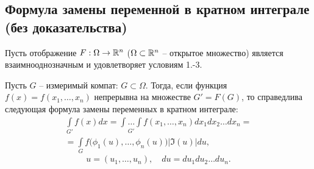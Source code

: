 \subsection{Формула замены переменной в кратном интеграле (без доказательства)}

\begin{theorem}
    Пусть отображение $ F: \Omega \rightarrow \mathbb{R}^n $ ($ \Omega \subset \mathbb{R}^n $ -- открытое множество) является взаимнооднозначным и удовлетворяет условиям 1.-3.

    Пусть $ G $ -- измеримый компат: $ G \subset \Omega $. Тогда, если функция $ f(x) = f(x_1,\ldots,x_n) $ непрерывна на множестве $ G'=F(G) $, то справедлива следующая формула замены переменных в кратном интеграле:
    \begin{multline*}
        \int\limits_{G'}f(x)dx = \underset{G'}{\int\ldots\int}f(x_1,\ldots,x_n)dx_1dx_2\ldots dx_n = \\
        = \int\limits_G f\big(\phi_1(u),\ldots,\phi_n(u)\big)\big|\mathfrak{I}(u)\big|du,
    \end{multline*}
    \[
        u = (u_1,\ldots,u_n), \quad du = du_1du_2\ldots du_n.
    \]
\end{theorem}
